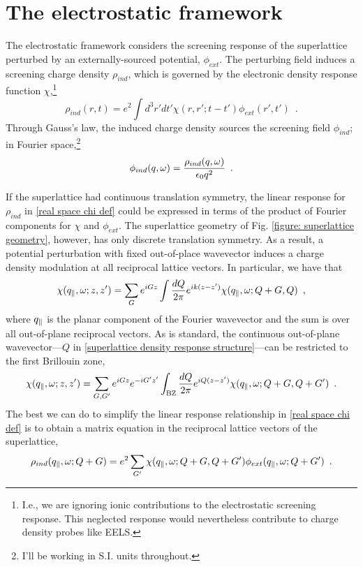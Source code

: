 \section{The electrostatic framework}
\label{section: electrostatic framework}

The electrostatic framework considers the screening response of the superlattice perturbed by an externally-sourced potential, $\phi_{ext}$.  The perturbing field induces a screening charge density $\rho_{ind}$, which is governed by the electronic density response function $\chi$,\footnote{I.e., we are ignoring ionic contributions to the electrostatic screening response.  This neglected response would nevertheless contribute to charge density probes like EELS.}
\begin{equation}
    \label{real space chi def}
    \rho_{ind}(r,t) = e^2\int d^3 r' dt' \chi(r,r';t-t')\phi_{ext}(r',t')
    \,\,\,.
\end{equation}
Through Gauss's law, the induced charge density sources the screening field $\phi_{ind}$; in Fourier space,\footnote{I'll be working in S.I. units throughout.}
\begin{equation}
    \label{Fourier induced Gauss law}
    \phi_{ind}(q,\omega) = \frac{\rho_{ind}(q,\omega)}{\epsilon_0 q^2}
    \,\,\,.
\end{equation}


If the superlattice had continuous translation symmetry, the linear response for $\rho_{ind}$ in \eqref{real space chi def} could be expressed in terms of the product of Fourier components for $\chi$ and $\phi_{ext}$.  The superlattice geometry of Fig. \ref{figure: superlattice geometry}, however, has only discrete translation symmetry.  As a result, a potential perturbation with fixed out-of-place wavevector induces a charge density modulation at all reciprocal lattice vectors.  In particular, we have that
\begin{equation}
    \label{superlattice density response structure}
    \chi(q_{\parallel},\omega;z,z') = \sum_G e^{iG z} \int \frac{dQ}{2\pi} e^{ik(z-z')}\chi(q_{\parallel},\omega;Q+G,Q)
    \,\,\,,
\end{equation}
where $q_{\parallel}$ is the planar component of the Fourier wavevector and the sum is over all out-of-plane reciprocal vectors.  As is standard, the continuous out-of-plane wavevector---$Q$ in \eqref{superlattice density response structure}---can be restricted to the first Brillouin zone,
\begin{equation}
    \chi(q_{\parallel},\omega;z,z') = \sum_{G,G'} e^{iG z} e^{-i G' z'} \int_\text{BZ} \frac{dQ}{2\pi} e^{iQ(z-z')}\chi(q_{\parallel},\omega;Q+G,Q+G')
    \,\,\,.
\end{equation}
The best we can do to simplify the linear response relationship in \eqref{real space chi def} is to obtain a matrix equation in the reciprocal lattice vectors of the superlattice,
\begin{equation}
     \rho_{ind}(q_{\parallel},\omega;Q+G) = e^2\sum_{G'}\chi(q_{\parallel},\omega;Q+G, Q+G')
     \phi_{ext}(q_{\parallel},\omega;Q+G')
     \,\,\,.
\end{equation}

